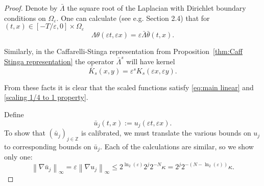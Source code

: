 \documentclass[11pt]{amsart}
\theoremstyle{remark}
\theoremstyle{definition}
\newcommand{\Z}{\mathbb{Z}}
\newcommand{\eps}{\varepsilon}
\newcommand{\norm}[1]{\left\lVert#1\right\rVert}
\newcommand{\del}{\partial}
\newcommand{\grad}{\nabla}
\begin{document}
\begin{proof}
Denote by $\bar{\Lambda}$ the square root of the Laplacian with Dirichlet boundary conditions on $\Omega_\eps$.  One can calculate (see e.g. \cite{CaSt} Section 2.4) that for $(t,x) \in [-T/\eps, 0]\times \Omega_\eps$
\[ \Lambda \theta(\eps t,\eps x) = \eps \bar{\Lambda} \bar{\theta}(t,x). \]

Similarly, in the Caffarelli-Stinga representation from Proposition~\ref{thm:Caff Stinga representation} the operator $\bar{\Lambda}^s$ will have kernel
\[ \bar{K}_s(x,y) = \eps^s K_s(\eps x,\eps y). \]

From these facts it is clear that the scaled functions satisfy \eqref{eq:main linear} and \eqref{scaling 1/4 to 1 property}.  

%

Define
\[ \bar{u}_j(t,x) := u_j(\eps t, \eps x). \]
To show that $(\bar{u}_j)_{j \in \Z}$ is calibrated, we must translate the various bounds on $u_j$ to corresponding bounds on $\bar{u}_j$.  Each of the calculations are similar, so we show only one:
\[ \norm{\grad \bar{u}_j}_\infty = \eps \norm{\grad u_j}_\infty \leq 2^{\ln_2(\eps)} 2^j 2^{-N} \kappa = 2^j 2^{-(N-\ln_2(\eps))} \kappa. \]

\end{proof}
\end{document}
